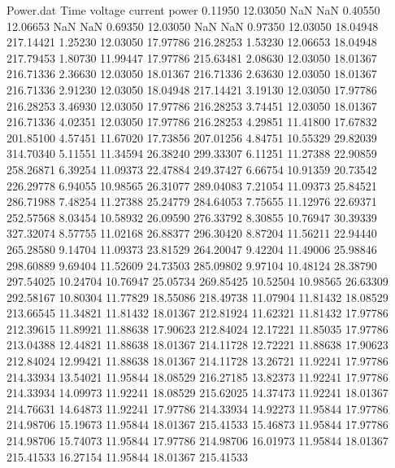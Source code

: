 \begin{filecontents}{Power.dat}
Time voltage current power
   0.11950   12.03050        NaN        NaN
   0.40550   12.06653        NaN        NaN
   0.69350   12.03050        NaN        NaN
   0.97350   12.03050   18.04948  217.14421
   1.25230   12.03050   17.97786  216.28253
   1.53230   12.06653   18.04948  217.79453
   1.80730   11.99447   17.97786  215.63481
   2.08630   12.03050   18.01367  216.71336
   2.36630   12.03050   18.01367  216.71336
   2.63630   12.03050   18.01367  216.71336
   2.91230   12.03050   18.04948  217.14421
   3.19130   12.03050   17.97786  216.28253
   3.46930   12.03050   17.97786  216.28253
   3.74451   12.03050   18.01367  216.71336
   4.02351   12.03050   17.97786  216.28253
   4.29851   11.41800   17.67832  201.85100
   4.57451   11.67020   17.73856  207.01256
   4.84751   10.55329   29.82039  314.70340
   5.11551   11.34594   26.38240  299.33307
   6.11251   11.27388   22.90859  258.26871
   6.39254   11.09373   22.47884  249.37427
   6.66754   10.91359   20.73542  226.29778
   6.94055   10.98565   26.31077  289.04083
   7.21054   11.09373   25.84521  286.71988
   7.48254   11.27388   25.24779  284.64053
   7.75655   11.12976   22.69371  252.57568
   8.03454   10.58932   26.09590  276.33792
   8.30855   10.76947   30.39339  327.32074
   8.57755   11.02168   26.88377  296.30420
   8.87204   11.56211   22.94440  265.28580
   9.14704   11.09373   23.81529  264.20047
   9.42204   11.49006   25.98846  298.60889
   9.69404   11.52609   24.73503  285.09802
   9.97104   10.48124   28.38790  297.54025
  10.24704   10.76947   25.05734  269.85425
  10.52504   10.98565   26.63309  292.58167
  10.80304   11.77829   18.55086  218.49738
  11.07904   11.81432   18.08529  213.66545
  11.34821   11.81432   18.01367  212.81924
  11.62321   11.81432   17.97786  212.39615
  11.89921   11.88638   17.90623  212.84024
  12.17221   11.85035   17.97786  213.04388
  12.44821   11.88638   18.01367  214.11728
  12.72221   11.88638   17.90623  212.84024
  12.99421   11.88638   18.01367  214.11728
  13.26721   11.92241   17.97786  214.33934
  13.54021   11.95844   18.08529  216.27185
  13.82373   11.92241   17.97786  214.33934
  14.09973   11.92241   18.08529  215.62025
  14.37473   11.92241   18.01367  214.76631
  14.64873   11.92241   17.97786  214.33934
  14.92273   11.95844   17.97786  214.98706
  15.19673   11.95844   18.01367  215.41533
  15.46873   11.95844   17.97786  214.98706
  15.74073   11.95844   17.97786  214.98706
  16.01973   11.95844   18.01367  215.41533
  16.27154   11.95844   18.01367  215.41533

\end{filecontents}
